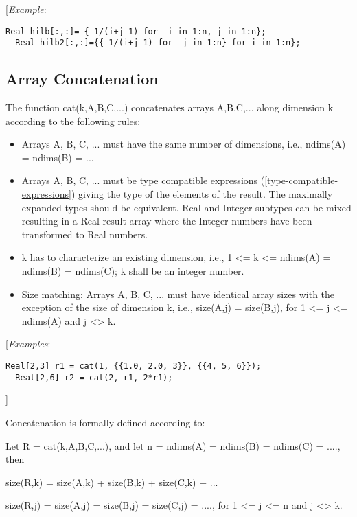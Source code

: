 {[}\emph{Example}:

\begin{lstlisting}[language=modelica]
  Real hilb[:,:]= { 1/(i+j-1) for  i in 1:n, j in 1:n};
  Real hilb2[:,:]={{ 1/(i+j-1) for  j in 1:n} for i in 1:n};
\end{lstlisting}
\subsection{Array Concatenation}

The function cat(k,A,B,C,...) concatenates arrays A,B,C,... along
dimension k according to the following rules:

\begin{itemize}
\item
  Arrays A, B, C, ... must have the same number of dimensions, i.e.,
  ndims(A) = ndims(B) = ...
\item
  Arrays A, B, C, ... must be type compatible expressions (\ref{type-compatible-expressions})
  giving the type of the elements of the result. The maximally expanded
  types should be equivalent. Real and Integer subtypes can be mixed
  resulting in a Real result array where the Integer numbers have been
  transformed to Real numbers.
\item
  k has to characterize an existing dimension, i.e., 1 \textless{}= k
  \textless{}= ndims(A) = ndims(B) = ndims(C); k shall be an integer
  number.
\item
  Size matching: Arrays A, B, C, ... must have identical array sizes
  with the exception of the size of dimension k, i.e., size(A,j) =
  size(B,j), for 1 \textless{}= j \textless{}= ndims(A) and j
  \textless{}\textgreater{} k.
\end{itemize}

{[}\emph{Examples}:

\begin{lstlisting}[language=modelica]
  Real[2,3] r1 = cat(1, {{1.0, 2.0, 3}}, {{4, 5, 6}});
  Real[2,6] r2 = cat(2, r1, 2*r1);
\end{lstlisting}
{]}

Concatenation is formally defined according to:

Let R = cat(k,A,B,C,...), and let n = ndims(A) = ndims(B) = ndims(C) =
...., then

size(R,k) = size(A,k) + size(B,k) + size(C,k) + ...

size(R,j) = size(A,j) = size(B,j) = size(C,j) = ...., for 1 \textless{}=
j \textless{}= n and j \textless{}\textgreater{} k.


